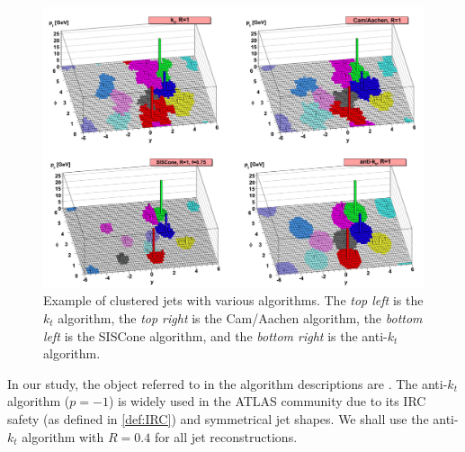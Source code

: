 \begin{figure}[ht]
    \centering
    \includegraphics[width=1.\textwidth]{src/img/anitkt.png}
    \caption{Example of clustered jets with various algorithms. The \emph{top left} is the $k_t$ algorithm, the \emph{top right} is the Cam/Aachen algorithm, the \emph{bottom left} is the SISCone algorithm, and the \emph{bottom right} is the anti-$k_t$ algorithm.}
    \label{fig:jet_reco}
\end{figure}

In our study, the object referred to in the algorithm descriptions are \PFOs.
The anti-$k_t$ algorithm ($p=-1$) is widely used in the ATLAS community due to its IRC safety (as defined in \cref{def:IRC}) and symmetrical jet shapes. 
We shall use the anti-$k_t$ algorithm with $R=0.4$ for all jet reconstructions.


